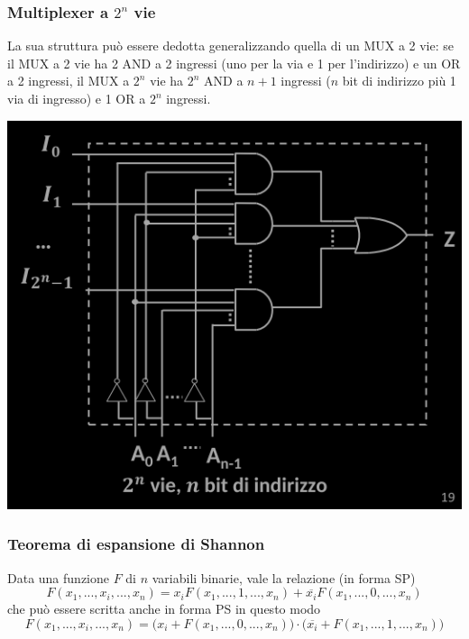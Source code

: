 \documentclass{article}
\begin{document}
\subsubsection{Multiplexer a $2^n$ vie}
La sua struttura può essere dedotta generalizzando quella di un MUX a 2 vie: se il MUX a 2 vie ha 2 AND a 2 ingressi (uno per la via e 1 per l’indirizzo) e un OR a 2 ingressi, il MUX a $2^n$ vie ha $2^n$ AND a $n+1$ ingressi ($n$ bit di indirizzo più 1 via di ingresso) e 1 OR a $2^n$ ingressi.
\begin{center}
    \includegraphics[scale=0.9]{MUX2n.png}
\end{center}
\subsubsection{Teorema di espansione di Shannon}
Data una funzione $F$ di $n$ variabili binarie, vale la relazione (in forma SP)
$$ F(x_1,...,x_i,...,x_n) = x_i F(x_1,...,1,...,x_n) + \overline{x_i} F(x_1,...,0,...,x_n)  $$
che può essere scritta anche in forma PS in questo modo
$$ F(x_1,...,x_i,...,x_n) = 
\Big(x_i + F(x_1,...,0,...,x_n) \Big) \cdot \Big( \overline{x_i} + F(x_1,...,1,...,x_n) \Big) $$
\end{document}
